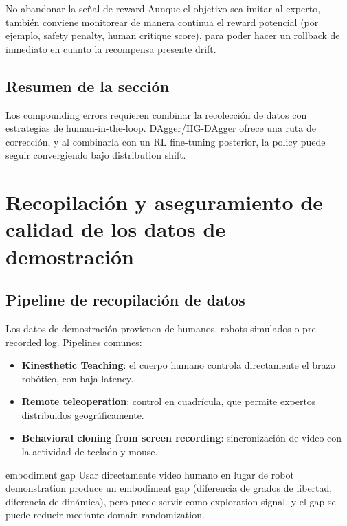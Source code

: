 \documentclass[a4paper]{article}
\begin{document}
\begin{warningbox}{No abandonar la señal de reward}
Aunque el objetivo sea imitar al experto, también conviene monitorear de manera continua el reward potencial (por ejemplo, safety penalty, human critique score), para poder hacer un rollback de inmediato en cuanto la recompensa presente drift.
\end{warningbox}

\subsection{Resumen de la sección}

Los compounding errors requieren combinar la recolección de datos con estrategias de human-in-the-loop. DAgger/HG-DAgger ofrece una ruta de corrección, y al combinarla con un RL fine-tuning posterior, la policy puede seguir convergiendo bajo distribution shift.

\section{Recopilación y aseguramiento de calidad de los datos de demostración}

\subsection{Pipeline de recopilación de datos}

Los datos de demostración provienen de humanos, robots simulados o pre-recorded log. Pipelines comunes:
\begin{itemize}
    \item \textbf{Kinesthetic Teaching}: el cuerpo humano controla directamente el brazo robótico, con baja latency.
    \item \textbf{Remote teleoperation}: control en cuadrícula, que permite expertos distribuidos geográficamente.
    \item \textbf{Behavioral cloning from screen recording}: sincronización de video con la actividad de teclado y mouse.
\end{itemize}

\begin{knowledgebox}{embodiment gap}
Usar directamente video humano en lugar de robot demonstration produce un embodiment gap (diferencia de grados de libertad, diferencia de dinámica), pero puede servir como exploration signal, y el gap se puede reducir mediante domain randomization.
\end{knowledgebox}
\end{document}
